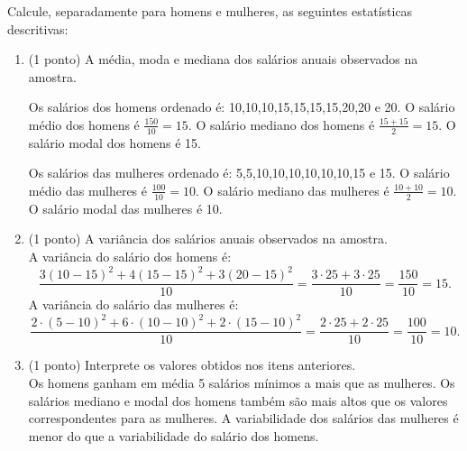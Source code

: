 \documentclass{article}
\begin{document}
\begin{enumerate}
Calcule, separadamente para homens e mulheres, as seguintes estatísticas descritivas:

\begin{enumerate}
	\item (1 ponto) A média, moda e mediana dos salários anuais observados na amostra.\\
	{\color{blue}
	Os salários dos homens ordenado é: 10,10,10,15,15,15,15,20,20 e 20. O salário médio dos homens é $\frac{150}{10} = 15$. O salário mediano dos homens é $\frac{15 + 15}{2} = 15$. O salário modal dos homens é 15.
	
	Os salários das mulheres ordenado é: 5,5,10,10,10,10,10,10,15 e 15. O salário médio das mulheres é $\frac{100}{10} = 10$. O salário mediano das mulheres é $\frac{10 + 10}{2} = 10$. O salário modal das mulheres é 10.
	}
	
	\item (1 ponto) A variância dos salários anuais observados na amostra.\\
	{\color{blue}
	A variância do salário dos homens é:
	$$
	\frac{3(10-15)^2 + 4(15-15)^2 + 3(20-15)^2}{10}
	= \frac{3 \cdot 25 + 3\cdot 25}{10}
	= \frac{150}{10} = 15.
	$$
	A variância do salário das mulheres é:
	$$
	\frac{2 \cdot (5-10)^2 + 6 \cdot (10-10)^2 + 2 \cdot (15-10)^2}{10}
	= \frac{2 \cdot 25 + 2\cdot 25}{10}
	= \frac{100}{10} = 10.
	$$
	}
	
	\item (1 ponto) Interprete os valores obtidos nos itens anteriores.\\
	{\color{blue}
	Os homens ganham em média 5 salários mínimos a mais que as mulheres. Os salários mediano e modal dos homens também são mais altos que os valores correspondentes para as mulheres. A variabilidade dos salários das mulheres é menor do que a variabilidade do salário dos homens.
	}
\end{enumerate}



\end{enumerate}
\end{document}
